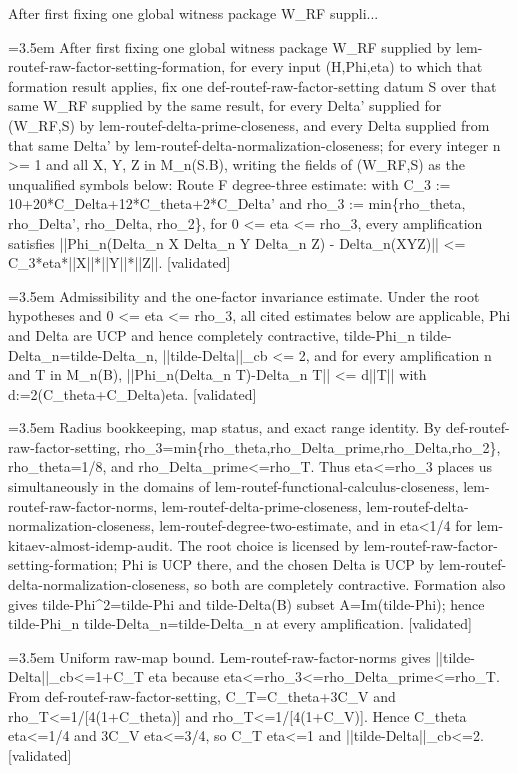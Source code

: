 \documentclass{article}
\newcommand{\step}[1]{\par\noindent\hangindent=3.5em\hangafter=1%
  \makebox[3.5em][l]{\textbf{#1.}}}
\newcommand{\steptag}[1]{\hfill{\small\textsf{[#1]}}}
\begin{document}
\begin{proofbox}{After first fixing one global witness package W\_RF suppli...}
\step{1} After first fixing one global witness package W\_RF supplied by lem-routef-raw-factor-setting-formation, for every input (H,Phi,eta) to which that formation result applies, fix one def-routef-raw-factor-setting datum S over that same W\_RF supplied by the same result, for every Delta' supplied for (W\_RF,S) by lem-routef-delta-prime-closeness, and every Delta supplied from that same Delta' by lem-routef-delta-normalization-closeness; for every integer n >= 1 and all X, Y, Z in M\_n(S.B), writing the fields of (W\_RF,S) as the unqualified symbols below: Route F degree-three estimate: with C\_3 := 10+20*C\_Delta+12*C\_theta+2*C\_Delta' and rho\_3 := min\{rho\_theta, rho\_Delta', rho\_Delta, rho\_2\}, for 0 <= eta <= rho\_3, every amplification satisfies ||Phi\_n(Delta\_n X Delta\_n Y Delta\_n Z) - Delta\_n(XYZ)|| <= C\_3*eta*||X||*||Y||*||Z||. \steptag{validated} \\[6pt]
\step{1.1} Admissibility and the one-factor invariance estimate. Under the root hypotheses and 0 <= eta <= rho\_3, all cited estimates below are applicable, Phi and Delta are UCP and hence completely contractive, tilde-Phi\_n tilde-Delta\_n=tilde-Delta\_n, ||tilde-Delta||\_cb <= 2, and for every amplification n and T in M\_n(B), ||Phi\_n(Delta\_n T)-Delta\_n T|| <= d||T|| with d:=2(C\_theta+C\_Delta)eta. \steptag{validated} \\[6pt]
\step{1.1.1} Radius bookkeeping, map status, and exact range identity. By def-routef-raw-factor-setting, rho\_3=min\{rho\_theta,rho\_Delta\_prime,rho\_Delta,rho\_2\}, rho\_theta=1/8, and rho\_Delta\_prime<=rho\_T. Thus eta<=rho\_3 places us simultaneously in the domains of lem-routef-functional-calculus-closeness, lem-routef-raw-factor-norms, lem-routef-delta-prime-closeness, lem-routef-delta-normalization-closeness, lem-routef-degree-two-estimate, and in eta<1/4 for lem-kitaev-almost-idemp-audit. The root choice is licensed by lem-routef-raw-factor-setting-formation; Phi is UCP there, and the chosen Delta is UCP by lem-routef-delta-normalization-closeness, so both are completely contractive. Formation also gives tilde-Phi\textasciicircum{}2=tilde-Phi and tilde-Delta(B) subset A=Im(tilde-Phi); hence tilde-Phi\_n tilde-Delta\_n=tilde-Delta\_n at every amplification. \steptag{validated} \\[4pt]
\step{1.1.2} Uniform raw-map bound. Lem-routef-raw-factor-norms gives ||tilde-Delta||\_cb<=1+C\_T eta because eta<=rho\_3<=rho\_Delta\_prime<=rho\_T. From def-routef-raw-factor-setting, C\_T=C\_theta+3C\_V and rho\_T<=1/[4(1+C\_theta)] and rho\_T<=1/[4(1+C\_V)]. Hence C\_theta eta<=1/4 and 3C\_V eta<=3/4, so C\_T eta<=1 and ||tilde-Delta||\_cb<=2. \steptag{validated} \\[4pt]

\end{proofbox}
\end{document}
